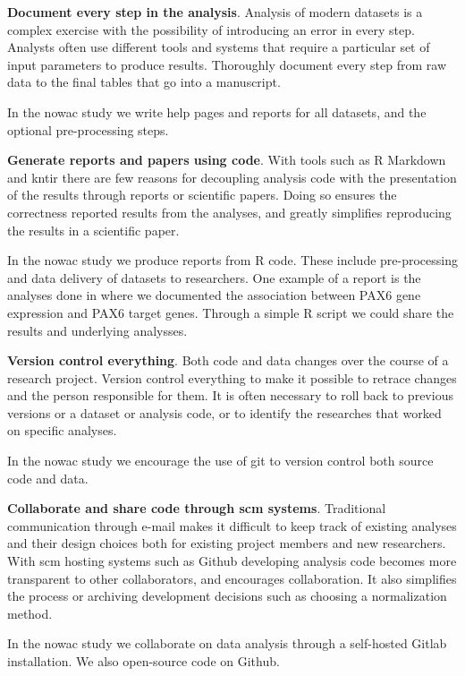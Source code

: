 \textbf{Document every step in the analysis}. Analysis of modern datasets is a
complex exercise with the possibility of introducing an error in every step.
Analysts often use different tools and systems that require a particular set of
input parameters to produce results. Thoroughly document every step from raw
data to the final tables that go into a manuscript.

In the \gls{nowac} study we write help pages and reports for all datasets, and
the optional pre-processing steps. 

\textbf{Generate reports and papers using code}. With tools such as R
Markdown\cite{rmarkdown} and kntir there are few reasons for decoupling analysis
code with the presentation of the results through reports or scientific papers.
Doing so ensures the correctness reported results from the analyses, and greatly
simplifies reproducing the results in a scientific paper. 

In the \gls{nowac} study we produce reports from R code. These include
pre-processing and data delivery of datasets to researchers. One example of a
report is the analyses done in \cite{kiselev2018transcription} where we
documented the association between PAX6 gene expression and PAX6 target genes.
Through a simple R script we could share the results and underlying analysses.

\textbf{Version control everything}. Both code and data changes over the course
of a research project. Version control everything to make it possible to retrace
changes and the person responsible for them. It is often necessary to roll back
to previous versions or a dataset or analysis code, or to identify the
researches that worked on specific analyses. 

In the \gls{nowac} study we encourage the use of git to version control both
source code and data. 

\textbf{Collaborate and share code through \gls{scm} systems}. Traditional
communication through e-mail makes it difficult to keep track of existing
analyses and their design choices both for existing project members and new
researchers. With \gls{scm} hosting systems such as Github developing
analysis code becomes more transparent to other collaborators, and encourages
collaboration. It also simplifies the process or archiving development decisions
such as choosing a normalization method.

In the \gls{nowac} study we collaborate on data analysis through a self-hosted
Gitlab\cite{gitlab} installation. We also open-source code on Github. 


